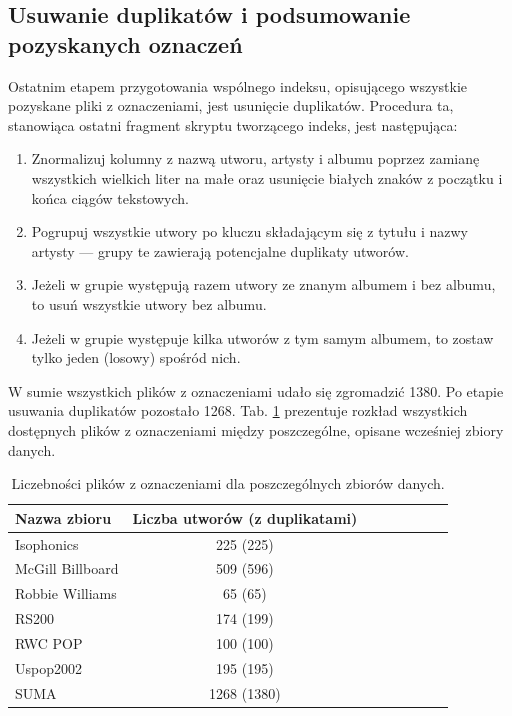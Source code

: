 \subsection{Usuwanie duplikatów i podsumowanie pozyskanych oznaczeń}

Ostatnim etapem przygotowania wspólnego indeksu, opisującego wszystkie pozyskane pliki z oznaczeniami, jest usunięcie duplikatów. Procedura ta, stanowiąca ostatni fragment skryptu tworzącego indeks, jest następująca:

\begin{enumerate}
    \item Znormalizuj kolumny z nazwą utworu, artysty i albumu poprzez zamianę wszystkich wielkich
        liter na małe oraz usunięcie białych znaków z początku i końca ciągów tekstowych.
    \item Pogrupuj wszystkie utwory po kluczu składającym się z tytułu i nazwy artysty --- grupy te
        zawierają potencjalne duplikaty utworów.
    \item Jeżeli w grupie występują razem utwory ze znanym albumem i bez albumu, to usuń wszystkie
        utwory bez albumu.
    \item Jeżeli w grupie występuje kilka utworów z tym samym albumem, to zostaw tylko jeden
        (losowy) spośród nich.
\end{enumerate}

W sumie wszystkich plików z oznaczeniami udało się zgromadzić 1380. Po etapie usuwania duplikatów pozostało 1268. Tab. \ref{tab:datasets1} prezentuje rozkład wszystkich dostępnych plików z oznaczeniami między poszczególne, opisane wcześniej zbiory danych.

\begin{table}
    \centering
    \caption{Liczebności plików z oznaczeniami dla poszczególnych zbiorów danych.}
    \label{tab:datasets1}
    \begin{tabular}{|l|c|c|c|c|c|c|c|} \hline
        Nazwa zbioru & Liczba utworów (z duplikatami) \\ \hline
        Isophonics & 225 (225) \\
        McGill Billboard & 509 (596) \\
        Robbie Williams & 65 (65) \\
        RS200 & 174 (199) \\
        RWC POP & 100 (100) \\
        Uspop2002 & 195 (195) \\
        SUMA & 1268 (1380) \\ \hline
    \end{tabular}
\end{table}



